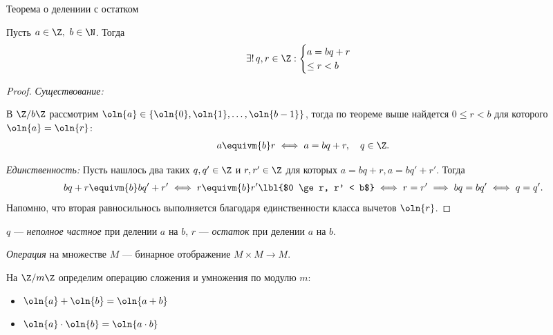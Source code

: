 \begin{follow}
    Теорема о делениии с остатком
    
    Пусть $a \in \Z,~b \in \N$. Тогда 
    \begin{gather*}
        \exists!\,q, r \in \Z : \begin{cases}a = bq + r \\ \leq r < b\end{cases}
    \end{gather*}
\end{follow}

\begin{proof}

    \textsl{Существование:}

    В $\Z/b\Z$ рассмотрим $\oln{a} \in \{\oln{0}, \oln{1}, \ldots, \oln{b-1}\}$, тогда по теореме выше найдется $0 \leq r < b$ для которого $\oln{a} = \oln{r}$:
    \begin{gather*}
        a \equivm{b} r \iff a = bq + r, \quad q \in \Z.
    \end{gather*}

    \textsl{Единственность:}
    Пусть нашлось два таких $q, q' \in \Z$ и $r, r' \in \Z$ для которых $a = bq + r, a = bq' + r'$. Тогда
    \begin{gather*}
        bq+r \equivm{b} bq'+r' \iff r \equivm{b} r' \lbl{$0 \ge r, r' < b$}\iff r = r' \implies bq = bq' \iff q = q'.
    \end{gather*}
    Напомню, что вторая равносильнось выполняется благодаря единственности класса вычетов $\oln{r}$.
\end{proof}

\begin{defn}
    $q$ --- \emph{неполное частное} при делении $a$ на $b$, $r$ --- \emph{остаток} при делении $a$ на $b$.
\end{defn}

\begin{defn}
    \emph{Операция} на множестве $M$ --- бинарное отображение $M \times M \to M$.
\end{defn}

На $\Z/m\Z$ определим операцию сложения и умножения по модулю $m$:

\begin{itemize}
    \item $\oln{a} + \oln{b} = \oln{a + b}$
    
    \item $\oln{a} \cdot \oln{b} = \oln{a \cdot b}$
\end{itemize}

